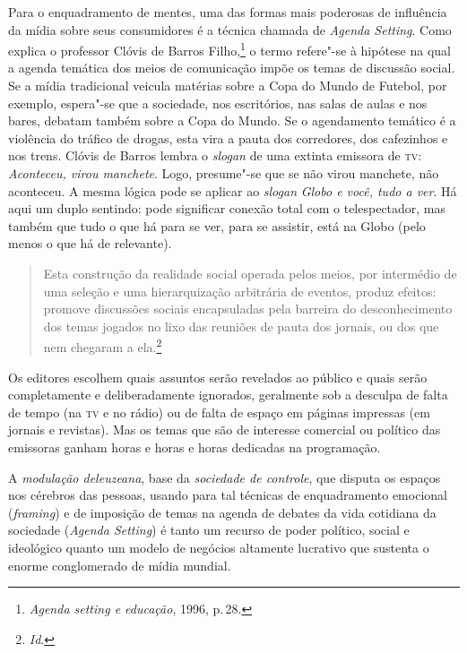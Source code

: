 Para o enquadramento de mentes, uma das formas mais poderosas de
influência da mídia sobre seus consumidores é a técnica chamada de
\textit{Agenda Setting}. Como explica o professor Clóvis de Barros Filho,\footnote{\textit{Agenda setting e educação}, 1996, p.\,28.} o termo refere"-se à hipótese na qual a agenda temática
dos meios de comunicação impõe os temas de discussão social. Se a mídia
tradicional veicula matérias sobre a Copa do Mundo de Futebol, por
exemplo, espera"-se que a sociedade, nos escritórios, nas salas de aulas
e nos bares, debatam também sobre a Copa do Mundo. Se o agendamento
temático é a violência do tráfico de drogas, esta vira a pauta dos
corredores, dos cafezinhos e nos trens. Clóvis de Barros lembra o
\textit{slogan} de uma extinta emissora de \textsc{tv}: \textit{Aconteceu, virou
manchete}. Logo, presume"-se que se não virou manchete, não aconteceu.
A mesma lógica pode se aplicar ao \textit{slogan} \textit{Globo e você,
tudo a ver}. Há aqui um duplo sentindo: pode significar conexão total
com o telespectador, mas também que tudo o que há para se ver, para se
assistir, está na Globo (pelo menos o que há de relevante).

\begin{quote}
Esta construção da realidade social operada pelos meios, por
intermédio de uma seleção e uma hierarquização arbitrária de eventos,
produz efeitos: promove discussões sociais encapsuladas pela barreira do
desconhecimento dos temas jogados no lixo das reuniões de pauta dos
jornais, ou dos que nem chegaram a ela.\footnote{\textit{Id}.}
\end{quote}

Os editores escolhem quais assuntos serão revelados ao público e quais
serão completamente e deliberadamente ignorados, geralmente sob a
desculpa de falta de tempo (na \textsc{tv} e no rádio) ou de falta de espaço em
páginas impressas (em jornais e revistas). Mas os temas que são de
interesse comercial ou político das emissoras ganham horas e horas e
horas dedicadas na programação.

A \textit{modulação deleuzeana}, base da \textit{sociedade de controle}, que
disputa os espaços nos cérebros das pessoas, usando para tal técnicas de
enquadramento emocional (\textit{framing}) e de imposição de temas na
agenda de debates da vida cotidiana da sociedade (\textit{Agenda Setting})
é tanto um recurso de poder político, social e ideológico quanto um
modelo de negócios altamente lucrativo que sustenta o enorme
conglomerado de mídia mundial.

